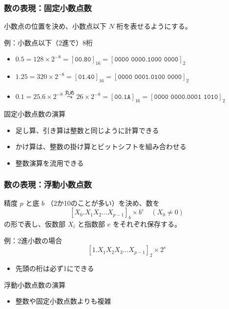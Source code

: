\documentclass[aspectratio=169]{beamer}
\newcommand{\hexa}[1]{[\texttt{#1}]_{16}}
\newcommand{\binary}[1]{[\texttt{#1}]_{2}}
\newcommand{\roundsto}{\stackrel{\text{丸め}}{\leadsto}}
\begin{document}
\begin{frame}\frametitle{数の表現：固定小数点数}
  小数点の位置を決め、小数点以下 $N$ 桁を表せるようにする。

  \begin{exampleblock}{例：小数点以下（2進で）8桁}
    \begin{itemize}
    \item $0.5=128\times 2^{-8}=\hexa{00.80}=\binary{0000 0000.1000 0000}$
    \item $1.25=320\times 2^{-8}=\hexa{01.40}=\binary{0000 0001.0100 0000}$
    \item $0.1=25.6\times 2^{-8}\roundsto 26\times 2^{-8}=\hexa{00.1A}=\binary{0000 0000.0001 1010}$
    \end{itemize}
  \end{exampleblock}

  \begin{block}{固定小数点数の演算}
    \begin{itemize}
    \item 足し算、引き算は整数と同じように計算できる
    \item かけ算は、整数の掛け算とビットシフトを組み合わせる
    \item 整数演算を流用できる
    \end{itemize}
  \end{block}
\end{frame}

\begin{frame}\frametitle{数の表現：浮動小数点数}
  精度 $p$ と底 $b$ （2か10のことが多い）を決め、数を
  \[[X_0.X_1X_2\dots X_{p-1}]_b\times b^e \quad (X_0\ne 0)\]
  の形で表し、仮数部 \(X_i\) と指数部 \(e\) をそれぞれ保存する。

  \begin{exampleblock}{例：2進小数の場合}
    \[[1.X_1X_2X_3\dots X_{p-1}]_2\times 2^e\]
    \begin{itemize}
    \item 先頭の桁は必ず1にできる
    \end{itemize}
  \end{exampleblock}

  \begin{block}{浮動小数点数の演算}
    \begin{itemize}
    \item 整数や固定小数点数よりも複雑
    \end{itemize}
  \end{block}
\end{frame}
\end{document}
